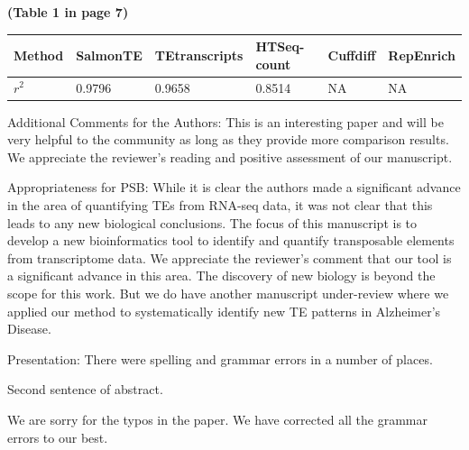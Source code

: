 \documentclass[10pt]{article}
\begin{document}
\begin{response}
\textbf{(Table 1 in page 7)}
\begin{table}[h]
\begin{center}
\begin{tabular}{l|lllll}
	\hline
	Method    & SalmonTE & TEtranscripts & HTSeq-count & Cuffdiff & RepEnrich  \\ \hline
	 $r^2$ & 0.9796 & 0.9658 & 0.8514 & NA & NA \\ \hline
\end{tabular}
\end{center}
\end{table}


\end{response}

\begin{response}{Additional Comments for the Authors: This is an interesting paper and will be very helpful to the community as long as they provide more comparison results.}
We appreciate the reviewer's reading and positive assessment of our manuscript.
\end{response}


\begin{response}{Appropriateness for PSB: While it is clear the authors made a significant advance in the area of quantifying TEs from RNA-seq data, it was not clear that this leads to any new biological conclusions.}
The focus of this manuscript is to develop a new bioinformatics tool to identify and quantify transposable elements from 
transcriptome data.  We appreciate the reviewer's comment that our tool is a significant advance in this area.  The discovery of new biology is beyond the scope for this work. But we do have another manuscript under-review where we applied our method to systematically identify new TE patterns in Alzheimer's Disease.
\end{response}


\begin{response}{Presentation: There were spelling and grammar errors in a number of places.

Second sentence of abstract. 
}

We are sorry for the typos in the paper.  We have corrected all the grammar errors to our best. 
\end{response}
\end{document}
